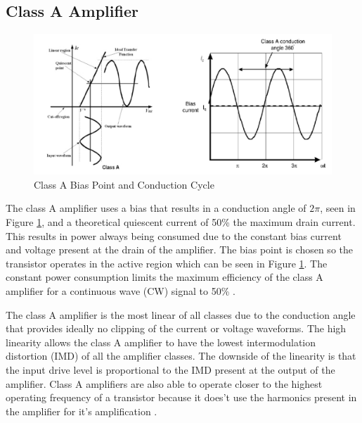 \subsection{Class A Amplifier}

\begin{figure}
  \centering
  \includegraphics[width=6in]{figures/classes/classa}
  \caption{Class A Bias Point and Conduction Cycle \cite{Rosu2001}}\label{classa_bias}
\end{figure}

The class A amplifier uses a bias that results in a conduction angle of $2\pi$, seen in Figure \ref{classa_bias}, and a theoretical quiescent current of 50\% the maximum drain current. This results in power always being consumed due to the constant bias current and voltage present at the drain of the amplifier. The bias point is chosen so the transistor operates in the active region which can be seen in Figure \ref{classa_bias}. The constant power consumption limits the maximum efficiency of the class A amplifier for a continuous wave (CW) signal to 50\% \cite{C.Cripps2006}.


The class A amplifier is the most linear of all classes due to the conduction angle that provides ideally no clipping of the current or voltage waveforms. The high linearity allows the class A amplifier to have the lowest intermodulation distortion (IMD) of all the amplifier classes. The downside of the linearity is that the input drive level is proportional to the IMD present at the output of the amplifier. Class A amplifiers are also able to operate closer to the highest operating frequency of a transistor because it does't use the harmonics present in the amplifier for it's amplification \cite{Rosu2001}. %



